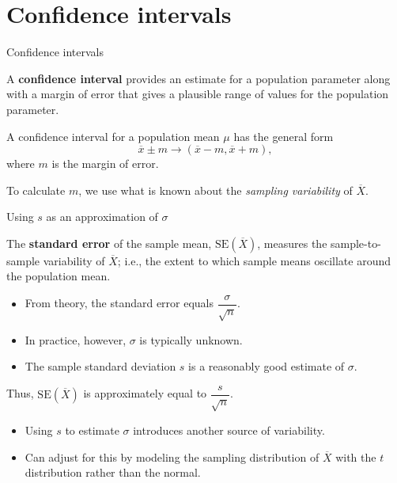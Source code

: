 \documentclass[
  ignorenonframetext,
  aspectratio=169]{beamer}
\begin{document}
\hypertarget{confidence-intervals}{%
\section{Confidence intervals}\label{confidence-intervals}}

\begin{frame}{Confidence intervals}
\protect\hypertarget{confidence-intervals-1}{}
\small

A \textbf{confidence interval} provides an estimate for a population
parameter along with a margin of error that gives a plausible range of
values for the population parameter.

A confidence interval for a population mean \(\mu\) has the general form
\[\overline{x} \pm m \rightarrow (\overline{x} - m, \overline{x} + m), \]
where \(m\) is the margin of error.

To calculate \(m\), we use what is known about the \emph{sampling
variability} of \(\overline{X}\).
\end{frame}

\begin{frame}{Using \(s\) as an approximation of \(\sigma\)}
\protect\hypertarget{using-s-as-an-approximation-of-sigma}{}
\small

The \textbf{standard error} of the sample mean,
\(\text{SE}(\overline{X})\), measures the sample-to-sample variability
of \(\overline{X}\); i.e., the extent to which sample means oscillate
around the population mean.

\begin{itemize}
\item
  From theory, the standard error equals \(\dfrac{\sigma}{\sqrt{n}}\).
\item
  In practice, however, \(\sigma\) is typically unknown.
\item
  The sample standard deviation \(s\) is a reasonably good estimate of
  \(\sigma\).
\end{itemize}

Thus, \(\text{SE}(\overline{X})\) is approximately equal to
\(\dfrac{s}{\sqrt{n}}\).

\begin{itemize}
\item
  Using \(s\) to estimate \(\sigma\) introduces another source of
  variability.
\item
  Can adjust for this by modeling the sampling distribution of
  \(\overline{X}\) with the \(t\) distribution rather than the normal.
\end{itemize}
\end{frame}
\end{document}
